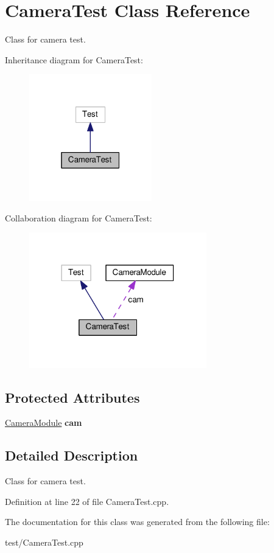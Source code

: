 \hypertarget{class_camera_test}{}\section{Camera\+Test Class Reference}
\label{class_camera_test}


Class for camera test.  




Inheritance diagram for Camera\+Test\+:
\nopagebreak
\begin{figure}[H]
\begin{center}
\leavevmode
\includegraphics[width=151pt]{class_camera_test__inherit__graph}
\end{center}
\end{figure}


Collaboration diagram for Camera\+Test\+:
\nopagebreak
\begin{figure}[H]
\begin{center}
\leavevmode
\includegraphics[width=218pt]{class_camera_test__coll__graph}
\end{center}
\end{figure}
\subsection*{Protected Attributes}
\begin{DoxyCompactItemize}
\item 
\hyperlink{class_camera_module}{Camera\+Module} {\bfseries cam}\hypertarget{class_camera_test_a76aa7e4350e4b5773e5641ffa837b100}{}\label{class_camera_test_a76aa7e4350e4b5773e5641ffa837b100}

\end{DoxyCompactItemize}


\subsection{Detailed Description}
Class for camera test. 

Definition at line 22 of file Camera\+Test.\+cpp.



The documentation for this class was generated from the following file\+:\begin{DoxyCompactItemize}
\item 
test/Camera\+Test.\+cpp\end{DoxyCompactItemize}
